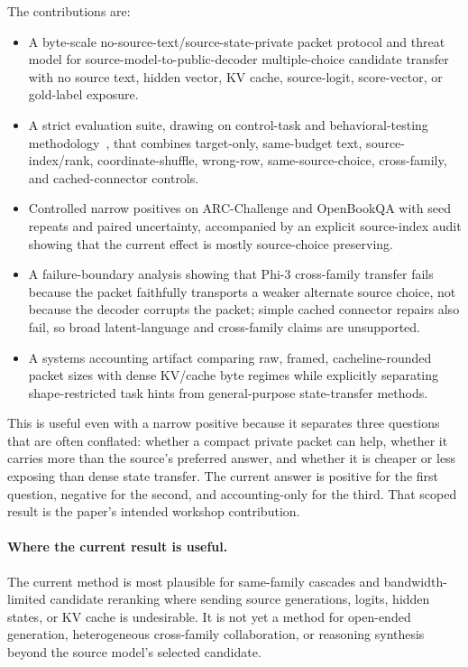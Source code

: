 \documentclass{article}
\newcommand{\arc}{ARC-Challenge}
\newcommand{\obqa}{OpenBookQA}
\begin{document}
The contributions are:
\begin{itemize}
\item A byte-scale no-source-text/source-state-private packet protocol and threat model for source-model-to-public-decoder multiple-choice candidate transfer with no source text, hidden vector, KV cache, source-logit, score-vector, or gold-label exposure.
\item A strict evaluation suite, drawing on control-task and behavioral-testing methodology~\citep{Hewitt2019ControlTasks,Adebayo2018SanityChecks,McCoy2019HANS,Ribeiro2020CheckList}, that combines target-only, same-budget text, source-index/rank, coordinate-shuffle, wrong-row, same-source-choice, cross-family, and cached-connector controls.
\item Controlled narrow positives on \arc{} and \obqa{} with seed repeats and paired uncertainty, accompanied by an explicit source-index audit showing that the current effect is mostly source-choice preserving.
\item A failure-boundary analysis showing that Phi-3 cross-family transfer fails because the packet faithfully transports a weaker alternate source choice, not because the decoder corrupts the packet; simple cached connector repairs also fail, so broad latent-language and cross-family claims are unsupported.
\item A systems accounting artifact comparing raw, framed, cacheline-rounded packet sizes with dense KV/cache byte regimes while explicitly separating shape-restricted task hints from general-purpose state-transfer methods.
\end{itemize}

This is useful even with a narrow positive because it separates three questions that are often conflated: whether a compact private packet can help, whether it carries more than the source's preferred answer, and whether it is cheaper or less exposing than dense state transfer. The current answer is positive for the first question, negative for the second, and accounting-only for the third. That scoped result is the paper's intended workshop contribution.

\paragraph{Where the current result is useful.}
The current method is most plausible for same-family cascades and bandwidth-limited candidate reranking where sending source generations, logits, hidden states, or KV cache is undesirable. It is not yet a method for open-ended generation, heterogeneous cross-family collaboration, or reasoning synthesis beyond the source model's selected candidate.
\end{document}
